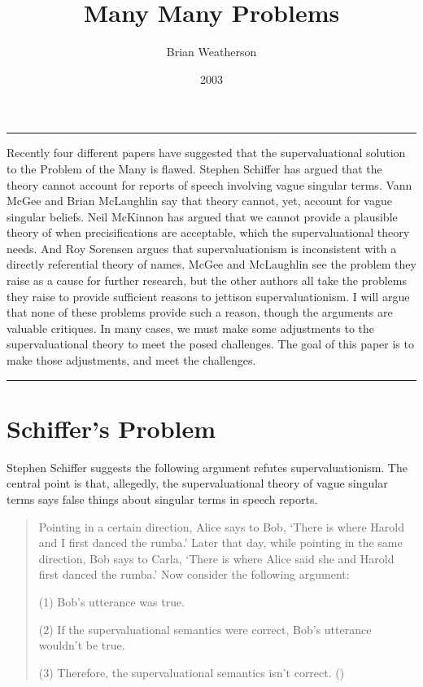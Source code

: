 \documentclass[
  10pt,
  letterpaper,
  DIV=11,
  numbers=noendperiod,
  twoside]{scrartcl}
\title{Many Many Problems}
\author{Brian Weatherson}
\date{2003}
\renewenvironment{abstract}
 {\vspace{-1.25cm}
 \quotation\small\noindent\rule{\linewidth}{.5pt}\par\smallskip
 \noindent }
 {\par\noindent\rule{\linewidth}{.5pt}\endquotation}
\begin{document}
\maketitle
\begin{abstract}
Recently four different papers have suggested that the supervaluational
solution to the Problem of the Many is flawed. Stephen Schiffer has
argued that the theory cannot account for reports of speech involving
vague singular terms. Vann McGee and Brian McLaughlin say that theory
cannot, yet, account for vague singular beliefs. Neil McKinnon has
argued that we cannot provide a plausible theory of when
precisifications are acceptable, which the supervaluational theory
needs. And Roy Sorensen argues that supervaluationism is inconsistent
with a directly referential theory of names. McGee and McLaughlin see
the problem they raise as a cause for further research, but the other
authors all take the problems they raise to provide sufficient reasons
to jettison supervaluationism. I will argue that none of these problems
provide such a reason, though the arguments are valuable critiques. In
many cases, we must make some adjustments to the supervaluational theory
to meet the posed challenges. The goal of this paper is to make those
adjustments, and meet the challenges.
\end{abstract}


\section{Schiffer's Problem}\label{schiffers-problem}

Stephen Schiffer suggests the following argument refutes
supervaluationism. The central point is that, allegedly, the
supervaluational theory of vague singular terms says false things about
singular terms in speech reports.

\begin{quote}
Pointing in a certain direction, Alice says to Bob, `There is where
Harold and I first danced the rumba.' Later that day, while pointing in
the same direction, Bob says to Carla, `There is where Alice said she
and Harold first danced the rumba.' Now consider the following argument:

(1) Bob's utterance was true.

(2) If the supervaluational semantics were correct, Bob's utterance
wouldn't be true.

(3) Therefore, the supervaluational semantics isn't correct.
()
\end{quote}
\end{document}
